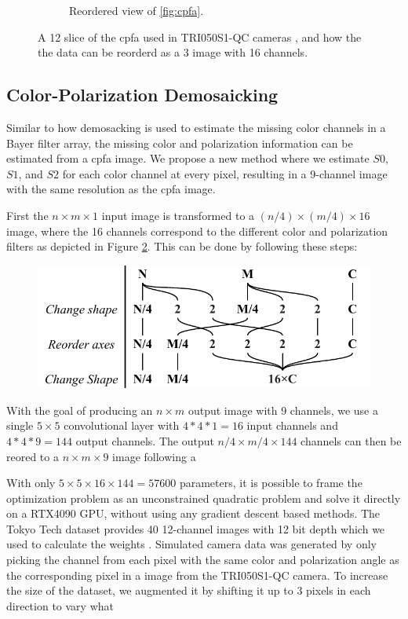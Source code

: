 \begin{figure}[H]
\begin{subfigure}[B]{.48\textwidth}
        \caption{Reordered view of \ref{fig:cpfa}. \label{fig:cpfa_reorder}}
    \end{subfigure}
    \caption{A 12 slice of the \gls{cpfa} used in TRI050S1-QC cameras \cite{lucidvisionlabsTritonMPPolarized2020}, and how the the data can be reorderd as a 3 image with 16 channels. \label{fig:polarization_sensor}}
\end{figure}

\subsection{Color-Polarization Demosaicking}
Similar to how demosacking is used to estimate the missing color channels in a Bayer filter array, the missing color and polarization information can be estimated from a \gls{cpfa} image.
We propose a new method where we estimate $S0$, $S1$, and $S2$ for each color channel at every pixel, resulting in a 9-channel image with the same resolution as the \gls{cpfa} image.

First the $n \times m \times 1$ input image is transformed to a $(n/4) \times (m/4) \times 16$ image, where the 16 channels correspond to the different color and polarization filters as depicted in Figure \ref{fig:polarization_sensor}.
This can be done by following these steps:
\begin{figure}[H]
    \centering
    \includegraphics[width=.6\textwidth]{figures/transformation.pdf}
\end{figure}%
With the goal of producing an $n \times m$ output image with 9 channels, we use a single $5 \times 5$ convolutional layer with $4*4*1=16$ input channels and $4*4*9=144$ output channels.
The output $n/4 \times m/4 \times 144$ channels can then be reored to a $n \times m \times 9$ image following a


With only $5\times5\times16\times144=57600$ parameters, it is possible to frame the optimization problem as an unconstrained quadratic problem and solve it directly on a RTX4090 GPU, without using any gradient descent based methods.
The Tokyo Tech dataset provides 40 12-channel images with 12 bit depth which we used to calculate the weights \cite{morimatsuMonochromeColorPolarization2020}.
Simulated camera data was generated by only picking the channel from each pixel with the same color and polarization angle as the corresponding pixel in a image from the TRI050S1-QC camera.
To increase the size of the dataset, we augmented it by shifting it up to 3 pixels in each direction to vary what


